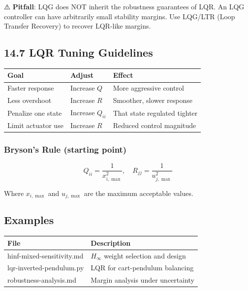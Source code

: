 \documentclass[11pt,a4paper]{book}
\begin{document}
\begin{itemize}
⚠️ \textbf{Pitfall}: LQG does NOT inherit the robustness guarantees of LQR. An LQG controller can have arbitrarily small stability margins. Use LQG/LTR (Loop Transfer Recovery) to recover LQR-like margins.

\medskip\noindent\hrulefill\medskip

\subsection{14.7 LQR Tuning Guidelines}

\begin{center}
\begin{tabular}{|l|l|l|}
\hline
Goal & Adjust & Effect \\
\hline
Faster response & Increase $Q$ & More aggressive control \\
Less overshoot & Increase $R$ & Smoother, slower response \\
Penalize one state & Increase $Q_{ii}$ & That state regulated tighter \\
Limit actuator use & Increase $R$ & Reduced control magnitude \\
\hline
\end{tabular}
\end{center}

\subsubsection{Bryson's Rule (starting point)}

\[Q_{ii} = \frac{1}{x_{i,\max}^2}, \quad R_{jj} = \frac{1}{u_{j,\max}^2}\]

Where $x_{i,\max}$ and $u_{j,\max}$ are the maximum acceptable values.

\medskip\noindent\hrulefill\medskip

\subsection{Examples}

\begin{center}
\begin{tabular}{|l|l|}
\hline
File & Description \\
\hline
hinf-mixed-sensitivity.md & $H_\infty$ weight selection and design \\
lqr-inverted-pendulum.py & LQR for cart-pendulum balancing \\
robustness-analysis.md & Margin analysis under uncertainty \\
\hline
\end{tabular}
\end{center}


\end{itemize}
\end{document}
